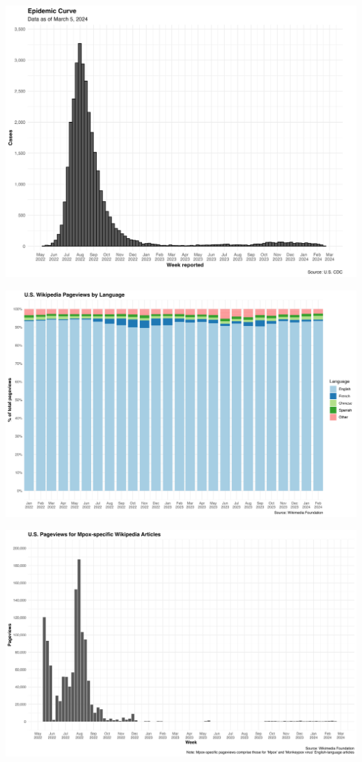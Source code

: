 \documentclass[
  12pt,
]{article}
\begin{document}
\begin{center}
\includegraphics{images/mpox-cases-USA-weekly.png}
\end{center}

\begin{center}
\includegraphics{images/wiki-project-views-USA-monthly.png}
\end{center}

\begin{center}
\includegraphics{images/wiki-pageviews-mpox-specific-USA-weekly-01.png}
\end{center}
\end{document}
